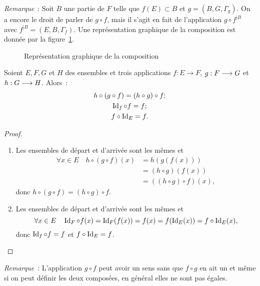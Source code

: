 \emph{Remarque}~: Soit \(B\) une partie de \(F\) telle que \(f(E) \subset B\) et 
\(g=(B,G,\Gamma_g)\). On a encore le droit de parler de \(g \circ f\), mais il 
s'agit en fait de l'application \(g \circ f^{|B}\) avec \( f^{|B} 
=(E,B,\Gamma_f)\).
Une représentation graphique de la composition est donnée par la 
figure~\ref{chap3-fig:compose}.
%
\begin{figure}
    \centering
    \caption{Représentation graphique de la composition}
    \label{chap3-fig:compose}
\end{figure}
%
\begin{prop}
    Soient \(E,F,G\) et \(H\) des ensembles et trois applications \(f:E 
    \longrightarrow F\), \(g:F \longrightarrow G\) et \(h:G \longrightarrow H\). 
    Alors~:
    \begin{gather}
        h \circ (g \circ f)=(h \circ g) \circ f;\\
        \operatorname{Id}_f \circ f = f;\\
        f \circ \operatorname{Id}_E=f.
    \end{gather}
\end{prop}
\begin{proof}
    \begin{enumerate}
        \item Les ensembles de départ et d'arrivée sont les mêmes et 
            \begin{align}
                \forall x \in E \quad h \circ (g \circ f)(x) &=h(g(f(x))) \\ 
                                                             &=(h \circ g)(f(x)) \\ 
                                                             &=((h \circ g) 
                                                             \circ f)(x),
            \end{align}
            donc \(h \circ (g \circ f)=(h \circ g) \circ f\).
        \item Les ensembles de départ et d'arrivée sont les mêmes et 
            \begin{equation}
                \forall x \in E \quad \operatorname{Id}_F \circ 
                f(x)=\operatorname{Id}_F(f(x))=f(x)=f(\operatorname{Id}_E(x))=f \circ \operatorname{Id}_E(x),
            \end{equation}
            donc \(\operatorname{Id}_f \circ f = f\) et \(f \circ \operatorname{Id}_E=f\).
    \end{enumerate}
\end{proof}
\emph{Remarque}~: L'application \(g \circ f\) peut avoir un sens sans que \(f 
\circ g\) en ait un et même si on peut définir les deux composées, en général 
elles ne sont pas égales.
